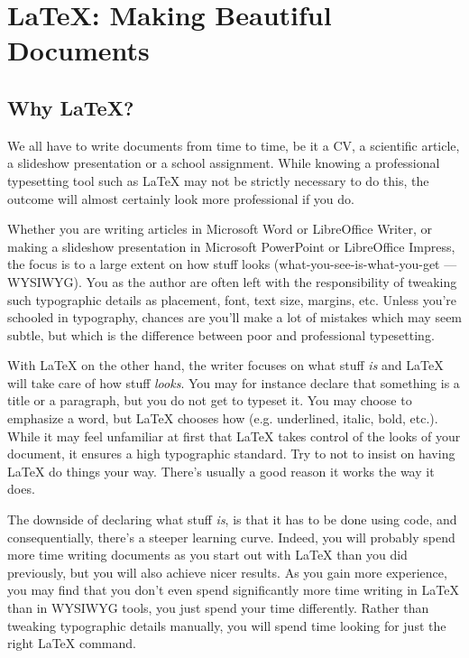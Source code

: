 \chapter{\LaTeX: Making Beautiful Documents}\label{ch:latex}

\section{Why \LaTeX?}
We all have to write documents from time to time, be it a CV, a scientific article, a slideshow presentation or a school assignment. While knowing a professional typesetting tool such as \LaTeX{} may not be strictly necessary to do this, the outcome will almost certainly look more professional if you do.

Whether you are writing articles in Microsoft Word or LibreOffice Writer, or making a slideshow presentation in Microsoft PowerPoint or LibreOffice Impress, the focus is to a large extent on how stuff looks (what-you-see-is-what-you-get --- WYSIWYG). You as the author are often left with the responsibility of tweaking such typographic details as placement, font, text size, margins, etc. Unless you're schooled in typography, chances are you'll make a lot of mistakes which may seem subtle, but which is the difference between poor and professional typesetting.

With \LaTeX{} on the other hand, the writer focuses on what stuff \emph{is} and \LaTeX{} will take care of how stuff \emph{looks}. You may for instance declare that something is a title or a paragraph, but you do not get to typeset it. You may choose to emphasize a word, but \LaTeX{} chooses how (e.g. underlined, italic, bold, etc.). While it may feel unfamiliar at first that \LaTeX{} takes control of the looks of your document, it ensures a high typographic standard. Try to not to insist on having \LaTeX{} do things your way. There's usually a good reason it works the way it does.

The downside of declaring what stuff \emph{is}, is that it has to be done using code, and consequentially, there's a steeper learning curve. Indeed, you will probably spend more time writing documents as you start out with \LaTeX{} than you did previously, but you will also achieve nicer results. As you gain more experience, you may find that you don't even spend significantly more time writing in \LaTeX{} than in WYSIWYG tools, you just spend your time differently. Rather than tweaking typographic details manually, you will spend time looking for just the right \LaTeX{} command.

